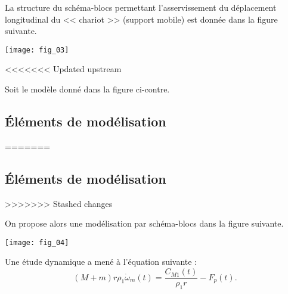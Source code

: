 La structure du schéma-blocs permettant l'asservissement du déplacement longitudinal du << chariot >> (support mobile) est donnée dans la figure suivante.


\begin{center}
\texttt{[image: fig\_03]}
\end{center}

\fi

<<<<<<< Updated upstream

Soit le modèle donné dans la figure ci-contre.


\subsection*{Éléments de modélisation}
=======
\subsection*{Éléments de modélisation}
>>>>>>> Stashed changes

\ifprof
\else


On propose alors une modélisation par schéma-blocs dans la figure suivante. 
\begin{center}
\texttt{[image: fig\_04]}
\end{center}

Une étude dynamique a mené à l'équation suivante : 
$$\left(M+m\right)r\rho_1 \dot{\omega}_m(t)=\dfrac{C_{M1}(t)}{\rho_1 r}-F_p(t).$$

